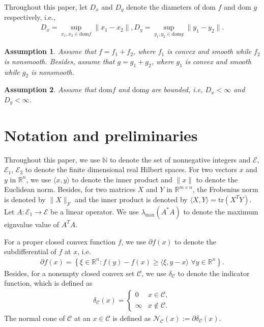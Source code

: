 \documentclass{article}
\numberwithin{equation}{section}
\newtheorem{assumption}{Assumption}[section]
\begin{document}
Throughout this paper, let $D_x$ and $D_y$ denote the diameters of $\mathrm{dom}$ $f$ 
and $\mathrm{dom}$ $g$ respectively, i.e.,
\begin{align} \label{Definition_of_diameter}
    D_x = \sup\limits_{x_1,x_2\in \mathrm{dom}f}\|x_1 -x_2\rVert,
    D_y = \sup\limits_{y_1,y_2\in \mathrm{dom}g}\|y_1 -y_2\rVert.
\end{align}

\begin{assumption} \label{Assumption 1}
    Assume that $f = f_1 +f_2$, 
    where $f_1$ is convex and smooth while $f_2$ is nonsmooth.
    Besides, assume that   
    $g = g_1 +g_2$, where $g_1$ is convex and smooth while $g_2$ is nonsmooth. 
\end{assumption}

\begin{assumption} \label{Assumption 2}
    Assume that $\mathrm{dom} f$ and $\mathrm{dom} g$ are bounded, i.e, $D_x<\infty$ and $D_y < \infty$. 
\end{assumption}

\section{Notation and preliminaries}
Throughout this paper, we use $\mathbb{N}$ to denote the set of nonnegative integers and $\mathcal{E}$, $\mathcal{E}_1$, $\mathcal{E}_2$ to denote the 
finite dimensional real Hilbert spaces. For two vectors $x$ and $y$ in $\mathbb{R}^n$, we use $\langle x,y\rangle$
to denote the inner product and $\|x\rVert$ to denote the Euclidean norm. Besides, for two matrices 
$X$ and $Y$ in $\mathbb{R}^{m\times n}$, the Frobenius norm is denoted by $\|X\rVert_F$ and 
the inner product is denoted by $\langle X,Y \rangle =\mathrm{tr}\left(X^TY\right)$.
Let $A: \mathcal{E}_1\rightarrow \mathcal{E}$ be a linear operator. We use $\lambda_{\max}(A^*A)$ to denote the maximum eignvalue value of $A^TA  $.

For a proper closed convex function $f$, we use $\partial f(x)$ to denote the subdifferential of $f$ at $x$, 
i.e.
\begin{align}
    \partial f(x) = \left\{\xi \in \mathbb{R}^n: f(y)- f(x) \geq\langle \xi, y-x \rangle \hspace{4pt} \forall y \in \mathbb{R}^n\right\}. 
    \nonumber
\end{align}
Besides, for a nonempty closed convex set $\mathcal{C}$, we use $\delta_{\mathcal{C}}$ to denote the indicator function, which
is defined as 
\begin{align}
    \delta_{\mathcal{C}}(x) = \left\{ 
        \begin{array}{cc}
            0  & x\in \mathcal{C},  \nonumber \\
            \infty & x \notin \mathcal{C}.  \nonumber
        \end{array}
     \right.  \nonumber
\end{align}
The normal cone of $\mathcal{C}$ at an $x\in\mathcal{C}$ is 
defined as $\mathcal{N}_{\mathcal{C}}(x):=\partial\delta_{\mathcal{C}}(x)$. 
\end{document}
